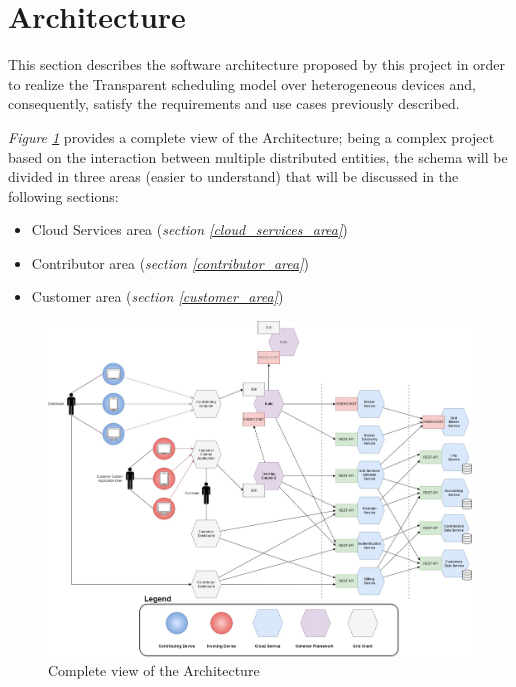 \section{Architecture}
This section describes the software architecture proposed by this project in order to realize the Transparent scheduling model over heterogeneous devices and, consequently, satisfy the requirements and use cases previously described.

\textit{Figure \ref{fig:architecture_complete}} provides a complete view of the Architecture; being a complex project based on the interaction between multiple distributed entities, the schema will be divided in three areas (easier to understand) that will be discussed in the following sections:
\begin{itemize}
    \item Cloud Services area (\textit{section \ref{cloud_services_area}})
    \item Contributor area (\textit{section \ref{contributor_area}})
    \item Customer area (\textit{section \ref{customer_area}})
\end{itemize}
\begin{figure}[!ht]
    \centering
    \includegraphics[width=\linewidth]{document/chapters/chapter_6/images/architecture_complete.jpg}
    \caption{Complete view of the Architecture}
    \label{fig:architecture_complete}
\end{figure}

